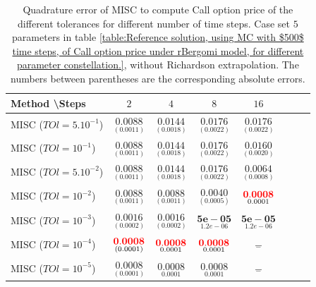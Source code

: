 \documentclass[11pt]{article}
\begin{document}
\begin{table}[h!]
	\centering
	\begin{tabular}{l*{6}{c}r}
		Method \textbackslash  Steps            & $2$ & $4$ & $8$ & $16$  \\
		\hline
		MISC ($TOl=5.10^{-1}$)  & $\underset{(   0.0011)}{\mathbf{  0.0088}}$ & $\underset{(
			0.0018)}{\mathbf{ 0.0144}}$ & $\underset{( 0.0022)}{\mathbf{0.0176}}$ & $\underset{(  0.0022)}{\mathbf{ 0.0176}}$  \\
		MISC ($TOl=10^{-1}$)  & $\underset{(   0.0011)}{\mathbf{  0.0088}}$ & $\underset{(
			0.0018)}{\mathbf{ 0.0144}}$& $\underset{( 0.0022)}{\mathbf{0.0176}}$  & $\underset{(  0.0020)}{\mathbf{ 0.0160}}$   \\
		MISC ($TOl=5.10^{-2}$)  &$\underset{(   0.0011)}{\mathbf{  0.0088}}$ & $\underset{(
			0.0018)}{\mathbf{ 0.0144}}$ & $\underset{( 0.0022)}{\mathbf{0.0176}}$  & $\underset{(0.0008)}{\mathbf{0.0064}}$  \\
		MISC ($TOl=10^{-2}$)  & $\underset{(   0.0011)}{\mathbf{  0.0088}}$ & $\underset{(0.0011
			)}{\mathbf{ 0.0088
		}}$ & $\underset{(0.0005)}{\mathbf{ 0.0040
		}}$ & $\underset{0.0001}{\mathbf{{\color{red}0.0008}}}$  \\
		MISC ($TOl=10^{-3}$)  & $\underset{( 0.0002)}{\mathbf{    0.0016}}$ & $\underset{(0.0002
			)}{\mathbf{ 0.0016
		}}$ & $\underset{1.2e-06}{\mathbf{5e-05}}$ & $\underset{1.2e-06}{\mathbf{5e-05}}$  \\
		MISC ($TOl=10^{-4}$)  & $\underset{( 0.0001)}{\mathbf{    {\color{red}0.0008}}}$ & $\underset{0.0001}{\mathbf{{\color{red}0.0008}}}$& $\underset{0.0001}{\mathbf{{\color{red}0.0008}}}$ & $\underset{-}{\mathbf{-}}$  \\
		
			MISC ($TOl=10^{-5}$)  & $\underset{( 0.0001)}{\mathbf{    0.0008}}$ & $\underset{0.0001}{\mathbf{0.0008}}$& $\underset{0.0001}{\mathbf{0.0008}}$ & $\underset{-}{\mathbf{-}}$  \\
		
		\hline
		
	\end{tabular}
	\caption{Quadrature error of MISC to compute Call option price of the different tolerances for different number of time steps. Case  set $5$ parameters in table \ref{table:Reference solution, using MC with $500$ time steps, of Call option price under rBergomi model, for different parameter constellation.}, without Richardson extrapolation. The numbers between parentheses are the corresponding absolute errors.}
	\label{Quadrature error of MISC to compute Call option price of the different tolerances for different number of time steps. Case  set $5$ parameters, without Richardson extrapolation. The numbers between parentheses are the corresponding absolute errors.}
\end{table}
\end{document}
